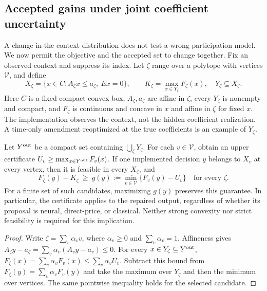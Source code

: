 \subsection{Accepted gains under joint coefficient uncertainty}\label{sec:r23-robust}
A change in the context distribution does not test a wrong participation model. We now permit the objective and the accepted set to change together. Fix an observed context and suppress its index. Let $\zeta$ range over a polytope with vertices $\mathcal V$, and define
\[
 X_\zeta=\{x\in C:A_\zeta x\leq a_\zeta,\ Ex=0\},\qquad
 K_\zeta=\max_{x\in Y_\zeta}F_\zeta(x),\quad Y_\zeta\subseteq X_\zeta.
\]
Here $C$ is a fixed compact convex box, $A_\zeta,a_\zeta$ are affine in $\zeta$, every $Y_\zeta$ is nonempty and compact, and $F_\zeta$ is continuous and concave in $x$ and affine in $\zeta$ for fixed $x$. The implementation observes the context, not the hidden coefficient realization. A time-only amendment reoptimized at the true coefficients is an example of $Y_\zeta$.

\begin{theorem}\label{thm:r23-robust}
Let $Y^{\rm out}$ be a compact set containing $\bigcup_\zeta Y_\zeta$. For each $v\in\mathcal V$, obtain an upper certificate $U_v\geq\max_{x\in Y^{\rm out}}F_v(x)$. If one implemented decision $y$ belongs to $X_v$ at every vertex, then it is feasible in every $X_\zeta$, and
\begin{equation}\label{eq:r23-gain}
 F_\zeta(y)-K_\zeta\ \geq\ g(y):=\min_{v\in\mathcal V}\{F_v(y)-U_v\}
 \quad\text{for every }\zeta.
\end{equation}
For a finite set of such candidates, maximizing $g(y)$ preserves this guarantee. In particular, the certificate applies to the repaired output, regardless of whether its proposal is neural, direct-price, or classical. Neither strong convexity nor strict feasibility is required for this implication.
\end{theorem}
\begin{proof}
Write $\zeta=\sum_v\alpha_v v$, where $\alpha_v\geq0$ and $\sum_v\alpha_v=1$. Affineness gives $A_\zeta y-a_\zeta=\sum_v\alpha_v(A_vy-a_v)\leq0$. For every $x\in Y_\zeta\subseteq Y^{\rm out}$,
$F_\zeta(x)=\sum_v\alpha_vF_v(x)\leq\sum_v\alpha_vU_v$.
Subtract this bound from $F_\zeta(y)=\sum_v\alpha_vF_v(y)$ and take the maximum over $Y_\zeta$ and then the minimum over vertices. The same pointwise inequality holds for the selected candidate.
\end{proof}

